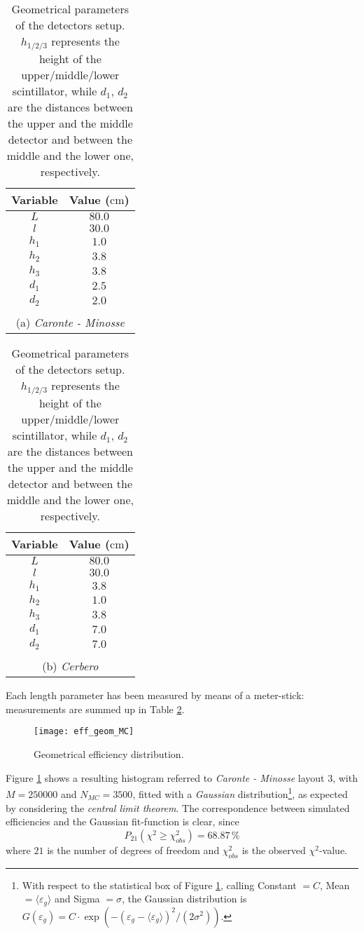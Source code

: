 \begin{table}[!hbp]
	\centering
	\begin{tabular}{cc}
	\toprule
	Variable & Value ($\si{\centi\meter}$)\\
	\midrule
	$L$ & $80.0$\\
	$l$ & $30.0$\\
	$h_1$ & $1.0$\\
	$h_2$ & $3.8$\\
	$h_3$ & $3.8$\\
	$d_1$ & $2.5$\\
	$d_2$ & $2.0$\\
	\bottomrule
	&\\
	\multicolumn{2}{c}{\footnotesize (a) \emph{Caronte - Minosse}}
	\end{tabular}\qquad\qquad
	\begin{tabular}{cc}
		\toprule
		Variable & Value ($\si{\centi\meter}$)\\
		\midrule
		$L$ & $80.0$\\
		$l$ & $30.0$\\
		$h_1$ & $3.8$\\
		$h_2$ & $1.0$\\
		$h_3$ & $3.8$\\
		$d_1$ & $7.0$\\
		$d_2$ & $7.0$\\
		\bottomrule
		&\\
		\multicolumn{2}{c}{\footnotesize (b) \emph{Cerbero}}
	\end{tabular}
	\caption{Geometrical parameters of the detectors setup. $h_{1/2/3}$ represents the height of the upper/middle/lower scintillator, while $d_1$, $d_2$ are the distances between the upper and the middle detector and between the middle and the lower one, respectively.} \label{tab:length}
\end{table}

Each length parameter has been measured by means of a meter-stick: measurements are summed up in Table \ref{tab:length}.
\begin{figure}[!htp]
	\centering
	\texttt{[image: eff\_geom\_MC]}
	\caption{Geometrical efficiency distribution.} 
	\label{fig:mc_eff_g}
\end{figure}
Figure \ref{fig:mc_eff_g} shows a resulting histogram referred to \emph{Caronte - Minosse} layout 3, with $M=250000$ and $N_{MC}=3500$, fitted with a \emph{Gaussian} distribution\footnote{With respect to the statistical box of Figure \ref{fig:mc_eff_g}, calling Constant $=C$, Mean $=\langle\varepsilon_{g}\rangle$ and Sigma $=\sigma$, the Gaussian distribution is $G(\varepsilon_{g})=C\cdot \exp\left(- \left(\varepsilon_{g}- \langle\varepsilon_{g}\rangle\right)^2/\left(2\sigma^2\right)\right)$.}, as expected by considering the \emph{central limit theorem}. The correspondence between simulated efficiencies and the Gaussian fit-function is clear, since
\begin{equation}
P_{21}\left(\chi^2 \geq \chi^2_{obs} \right) = 68.87\,\%
\end{equation}
where $21$ is the number of degrees of freedom and $\chi^2_{obs}$ is the observed $\chi^2$-value.\\

